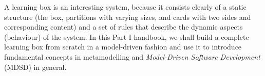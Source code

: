 A learning box is an interesting system, because it consists clearly of a static structure (the box, partitions with varying sizes, and cards with two sides and
corresponding content) and a set of rules that describe the dynamic aspects (behaviour) of the system. In this Part I handbook, we shall build a complete
learning box from scratch in a model-driven fashion and use it to introduce fundamental concepts in metamodelling and \emph{Model-Driven Software Development}
(MDSD) in general.
